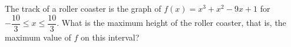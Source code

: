 The track of a roller coaster is the graph of $f(x)=x^3+x^2-9x+1$ for $-\dfrac{10}{3}\le x\le\dfrac{10}{3}$. What is the maximum height of the roller coaster, that is, the maximum value of $f$ on this interval?
